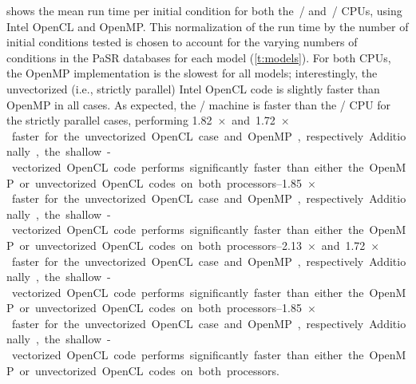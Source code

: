 \documentclass[12pt,number,sort&compress,preprint]{elsarticle}
\begin{document}
 shows the mean run time per initial condition for both the~\avx/ and~\sse/ CPUs, using Intel OpenCL and OpenMP.
This normalization of the run time by the number of initial conditions tested is chosen to account for the varying numbers of conditions in the PaSR databases for each model (\cref{t:models}).
For both CPUs, the OpenMP implementation is the slowest for all models; interestingly, the unvectorized (i.e., strictly parallel) Intel OpenCL code is slightly faster than OpenMP in all cases.
As expected, the \avx/ machine is faster than the \sse/ CPU for the strictly parallel cases, performing \SIrange{1.82}{2.13}{$\times$} and \SIrange{1.72}{1.85}{$\times$} faster for the unvectorized OpenCL case and OpenMP, respectively.
Additionally, the shallow-vectorized OpenCL code performs significantly faster than either the OpenMP or unvectorized OpenCL codes on both processors.
\end{document}
